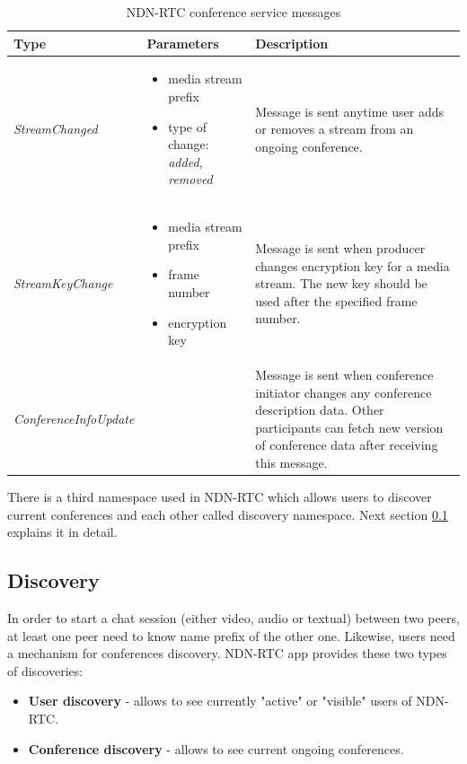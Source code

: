 \documentclass[12pt]{article}
\begin{document}
\begin{table}
\centering
\caption{NDN-RTC conference service messages}
\vspace{1em}
\small{
\begin{tabular}{|p{}|p{}|p{}|}
\hline
Type & Parameters & Description \\
\hline
\textit{StreamChanged} 
& \vspace{-1.8em} \begin{itemize} 
\item{media stream prefix}
\item{type of change: \textit{added, removed}}
\end{itemize} & Message is sent anytime user adds or removes a stream from an ongoing conference. \\ 
\hline
\textit{StreamKeyChange}
& \vspace{-1.8em} \begin{itemize} 
\item{media stream prefix}
\item{frame number}
\item{encryption key}
\end{itemize} & Message is sent when producer changes encryption key for a media stream. The new key should be used after the specified frame number. \\ 
\hline
\textit{ConferenceInfoUpdate}
& & Message is sent when conference initiator changes any conference description data. Other participants can fetch new version of conference data after receiving this message. \\ 
\hline
\end{tabular}}
\label{tab:msgs}
\end{table}

There is a third namespace used in NDN-RTC which allows users to discover current conferences and each other called discovery namespace. Next section \ref{sec:discovery} explains it in detail. 

\subsection{Discovery}
\label{sec:discovery}
In order to start a chat session (either video, audio or textual) between two peers, at least one peer need to know name prefix of the other one. Likewise, users need a mechanism for conferences discovery. NDN-RTC app provides these two types of discoveries: 
\begin{itemize}
\item \textbf{User discovery} - allows to see currently "active" or "visible" users of NDN-RTC.
\item \textbf{Conference discovery} - allows to see current ongoing conferences. 
\end{itemize}
\end{document}
